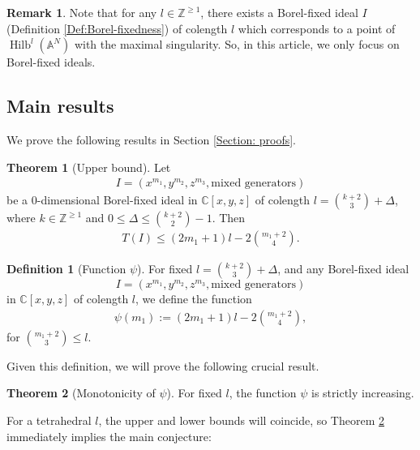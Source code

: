 \documentclass[11pt,a4paper,leqno,noamsfonts]{amsart}
\numberwithin{equation}{section}
\newcommand{\BA}{{\mathbb{A}}}
\newcommand{\BC}{{\mathbb{C}}}
\newcommand{\BZ}{{\mathbb{Z}}}
\DeclareMathOperator{\Hilb}{Hilb}
\theoremstyle{definition}
\newtheorem*{definition*}{Definition}
\newtheorem{remark}[definition]{Remark}
\theoremstyle{thm}
\newtheorem{thm}{Theorem}
\theoremstyle{ex}
\theoremstyle{sol}
\begin{document}
\begin{remark}\label{rem:Borel-fixed only}
    Note that for any $l\in \BZ^{\geq 1}$, there exists a Borel-fixed ideal $I$ (Definition \ref{Def:Borel-fixedness}) of colength $l$ which corresponds to a point of $\Hilb^l(\BA^N)$  with the maximal singularity. So, in this article, we only focus on Borel-fixed ideals.
    \end{remark}


\subsection{Main results} We prove the following results in Section \ref{Section: proofs}.

\begin{thm}[Upper bound]\label{thm:upperbound}
    Let 
    \begin{align*}
        I=(x^{m_1},y^{m_2},z^{m_3},\text{mixed generators})
    \end{align*}
    be a 0-dimensional Borel-fixed ideal in $\BC[x,y,z]$ of colength $l=\binom{k+2}{3}+\Delta$, where $k\in\BZ^{\geq1}$ and $0\leq \Delta \leq \binom{k+2}{2}-{1}$. Then 
    \begin{align*}
        T(I)
        \leq 
    (2m_1+1)l-2\binom{m_1+2}{4}. 
    \end{align*}
\end{thm}



\begin{definition*}[Function $\psi$]
For fixed $l={k+2 \choose 3}+\Delta$, and any Borel-fixed ideal $$I=(x^{m_1},y^{m_2},z^{m_3},\text{mixed generators})$$ in $\BC[x,y,z]$ of colength $l$,  
we define the function
\begin{align}
    \psi(m_1):=(2m_1+1)l-2{m_1+2 \choose 4}, 
\end{align}
for $\binom{m_1+2}{3}\leq l$.
\end{definition*}



Given this definition, we will prove the following crucial result.

\begin{thm}[Monotonicity of $\psi$]\label{thm:IncreasingU}
    For fixed $l$, the function $\psi$ is strictly increasing.
\end{thm}


For a tetrahedral $l$, the upper and lower bounds will coincide, so Theorem \ref{thm:IncreasingU} immediately implies the main conjecture:
\end{document}
